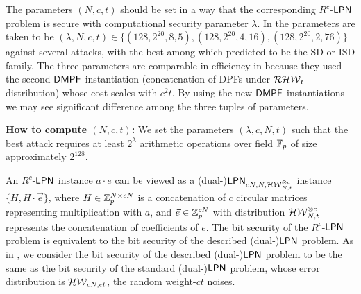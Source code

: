 The parameters $(N, c, t)$ should be set in a way that the corresponding $R^c$-${\sf LPN}$ problem is secure with computational security parameter $\lambda$. In \cite{cryptoeprint:2022/1035} the parameters are taken to be $(\lambda, N, c, t) \in\{ (128, 2^{20}, 8, 5), (128, 2^{20}, 4, 16), (128, 2^{20}, 2, 76)\}$ against several attacks, with the best among which predicted to be the SD or ISD family. The three parameters are comparable in efficiency in \cite{cryptoeprint:2022/1035} because they used the second ${\sf DMPF}$ instantiation (concatenation of DPFs under $\mathcal{RHW}_t$ distribution) whose cost scales with $c^2t$. By using the new ${\sf DMPF}$ instantiations we may see significant difference among the three tuples of parameters. 

\textbf{How to compute $(N,c,t)$: }We set the parameters $(\lambda, c, N, t)$ such that the best attack requires at least $2^\lambda$ arithmetic operations over field $\mathbb{F}_p$ of size approximately $2^{128}$. 

An $R^c$-${\sf LPN}$ instance $a\cdot e$ can be viewed as a (dual-)${\sf LPN}_{cN,N,\mathcal{HW}_{N,t}^{\otimes c}}$ instance $\{H, H\cdot \vec{e}\}$, where $H\in\mathbb{Z}_p^{N\times cN}$ is a concatenation of $c$ circular matrices representing multiplication with ${a}$, and $\vec{e}\in \mathbb{Z}_p^{cN}$ with distribution $\mathcal{HW}_{N,t}^{\otimes c}$ represents the concatenation of coefficients of $e$. The bit security of the $R^c$-${\sf LPN}$ problem is equivalent to the bit security of the described (dual-)${\sf LPN}$ problem. As in \cite{cryptoeprint:2022/1035}, we consider the bit security of the described (dual-)${\sf LPN}$ problem to be the same as the bit security of the standard (dual-)${\sf LPN}$ problem, whose error distribution is $\mathcal{HW}_{cN, ct}$, the random weight-$ct$ noises. 

